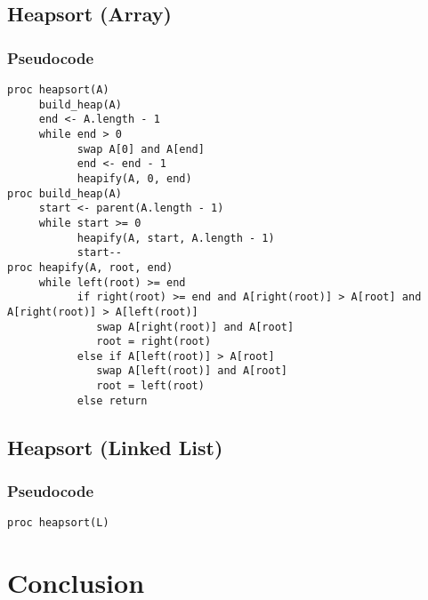 \documentclass[a4paper,12pt]{article}
\begin{document}
\subsection{Heapsort (Array)}
\subsubsection{Pseudocode}
\begin{verbatim}
proc heapsort(A)
     build_heap(A)
     end <- A.length - 1
     while end > 0
           swap A[0] and A[end]
           end <- end - 1
           heapify(A, 0, end)
proc build_heap(A)
     start <- parent(A.length - 1)
     while start >= 0
           heapify(A, start, A.length - 1)
           start--
proc heapify(A, root, end)
     while left(root) >= end
           if right(root) >= end and A[right(root)] > A[root] and A[right(root)] > A[left(root)]
              swap A[right(root)] and A[root]
              root = right(root)
           else if A[left(root)] > A[root]
              swap A[left(root)] and A[root]
              root = left(root)
           else return
\end{verbatim}
\subsection{Heapsort (Linked List)}
\subsubsection{Pseudocode}
\begin{verbatim}
proc heapsort(L)
\end{verbatim}
\section{Conclusion}
\end{document}
